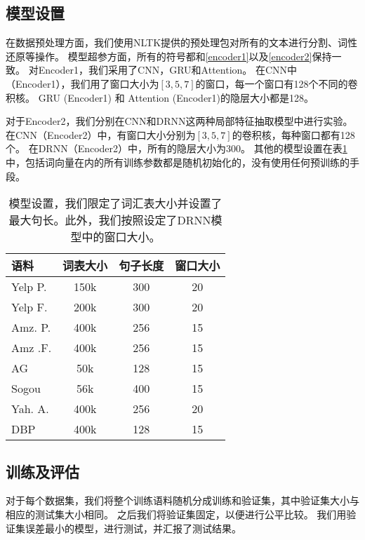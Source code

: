 \subsection{模型设置}

在数据预处理方面，我们使用NLTK提供的预处理包对所有的文本进行分割、词性还原等操作\citep{loper2002nltk}。
模型超参方面，所有的符号都和\ref{encoder1}以及\ref{encoder2}保持一致。
对Encoder1，我们采用了CNN，GRU和Attention。
在CNN中（Encoder1），我们用了窗口大小为$[3,5,7]$的窗口，每一个窗口有128个不同的卷积核。
GRU (Encoder1) 和 Attention (Encoder1)的隐层大小都是128。

对于Encoder2，我们分别在CNN和DRNN这两种局部特征抽取模型中进行实验。
在CNN（Encoder2）中，有窗口大小分别为$[3,5,7]$的卷积核，每种窗口都有128个。
在DRNN（Encoder2）中，所有的隐层大小为300。
其他的模型设置在表\ref{tab: settings}中，包括词向量在内的所有训练参数都是随机初始化的，没有使用任何预训练的手段\citep{mikolov2013distributed,peters2018deep,devlin2018bert}。
\begin{table}[t]  %
  \centering  %
  \small
  \begin{center}
    \begin{tabular}{lccc}
    \toprule
    语料 & 词表大小 & 句子长度 & 窗口大小 \\ 
    \midrule
      Yelp P. & 150k & 300 & 20  \\
      Yelp F. & 200k & 300 & 20  \\
      Amz. P. & 400k & 256 & 15  \\
      Amz .F. & 400k & 256 & 15  \\
      AG & 50k & 128 & 15  \\
      Sogou & 56k & 400 & 15  \\
      Yah. A. & 400k & 256 & 20  \\
      DBP & 400k & 128 & 15  \\
    \bottomrule
    \end{tabular}
  \end{center}
\caption{模型设置，我们限定了词汇表大小并设置了最大句长。此外，我们按照设定了DRNN模型中的窗口大小。}
\label{tab: settings} %
\end{table}

\subsection{训练及评估}
对于每个数据集，我们将整个训练语料随机分成训练和验证集，其中验证集大小与相应的测试集大小相同。
之后我们将验证集固定，以便进行公平比较。
我们用验证集误差最小的模型，进行测试，并汇报了测试结果。

